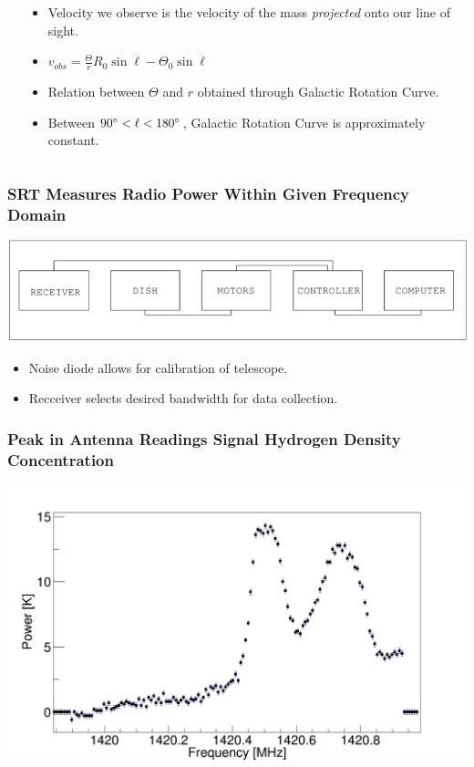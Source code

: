 \documentclass{beamer}
\begin{document}
\begin{frame}
\begin{columns}
\begin{column}{0.4\textwidth}
\end{column}
\begin{column}{0.6\textwidth}
  \begin{itemize}
    \item Velocity we observe is the velocity of the mass \textit{projected} onto our line of sight. 
      \pause
    \item $v_{obs} = \frac{\Theta}{r} R_0 \sin \ell - \Theta_0 \sin \ell$
      \pause
    \item Relation between $\Theta$ and $r$ obtained through Galactic Rotation Curve.
      \pause
    \item Between $90\degree < \ell < 180\degree$, Galactic Rotation Curve is approximately constant.
  \end{itemize} 
\end{column}
\end{columns}
\end{frame}

\begin{frame}
  \frametitle{SRT Measures Radio Power Within Given Frequency Domain}
  \includegraphics[width=1\textwidth]{block}
  \begin{itemize}
    \item Noise diode allows for calibration of telescope.
    \item Recceiver selects desired bandwidth for data collection.
  \end{itemize}
\end{frame}

\begin{frame}
  \frametitle{Peak in Antenna Readings Signal Hydrogen Density Concentration}
  \includegraphics[width=1\textwidth]{data_freq_small.png}
\end{frame}
\end{document}
